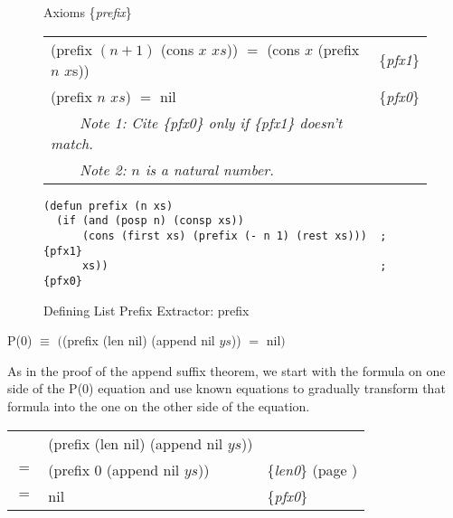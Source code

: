 \begin{figure}
\begin{center}
Axioms \{\emph{prefix}\}                                           \\
\begin{tabular}{ll}
\textsf{(prefix $(n + 1)$ (cons $x$ $xs$))} $=$ \textsf{(cons $x$ (prefix $n$ $x$s))} & \{\emph{pfx1}\} \\
\textsf{(prefix $n$ $xs$)} $=$  \textsf{nil}                                          & \{\emph{pfx0}\} \\
~~~~\emph{Note 1: Cite \{\emph{pfx0}\} only if \{\emph{pfx1}\} doesn't match.}&\\
~~~~\emph{Note 2: $n$ is a natural number.}
\end{tabular}
\begin{Verbatim}
(defun prefix (n xs)
  (if (and (posp n) (consp xs))
      (cons (first xs) (prefix (- n 1) (rest xs)))  ; {pfx1}
      xs))                                          ; {pfx0}
\end{Verbatim}
\end{center}
\caption{Defining List Prefix Extractor: \textsf{prefix}}
\label{prefix-equations}
\end{figure}

\begin{center}
P($0$) $\equiv$ $($\textsf{(prefix (len nil) (append nil $ys$))} $=$ \textsf{nil}$)$
\end{center}

As in the proof of the append suffix theorem, we start
with the formula on one side of the P(0) equation
and use known equations to gradually transform
that formula into the one on the other side of the equation.

\begin{center}
\begin{tabular}{lll}
    & \textsf{(prefix (len nil) (append nil $ys$))}  &                                                  \\
$=$ & \textsf{(prefix 0 (append nil $ys$))}          & \{\emph{len0}\} (page \pageref{len-equations})   \\
$=$ & \textsf{nil}                                   & \{\emph{pfx0}\}                                  \\
\end{tabular}
\end{center}

